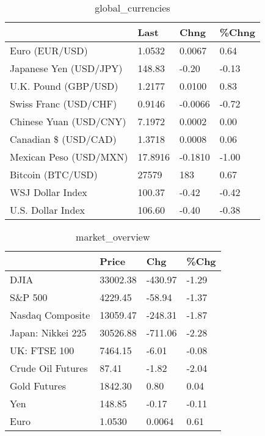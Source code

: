 \documentclass{article}%
\begin{document}
%


\begin{table}[htbp]%
\caption{global\_currencies}%
\centering%
\begin{adjustbox}{width=1\textwidth}%
\begin{tabular}{llll}
\toprule
                       &    Last &    Chng & \%Chng \\
\midrule
        Euro (EUR/USD) &  1.0532 &  0.0067 &  0.64 \\
Japanese Yen (USD/JPY) &  148.83 &   -0.20 & -0.13 \\
  U.K. Pound (GBP/USD) &  1.2177 &  0.0100 &  0.83 \\
 Swiss Franc (USD/CHF) &  0.9146 & -0.0066 & -0.72 \\
Chinese Yuan (USD/CNY) &  7.1972 &  0.0002 &  0.00 \\
  Canadian \$ (USD/CAD) &  1.3718 &  0.0008 &  0.06 \\
Mexican Peso (USD/MXN) & 17.8916 & -0.1810 & -1.00 \\
     Bitcoin (BTC/USD) &   27579 &     183 &  0.67 \\
      WSJ Dollar Index &  100.37 &   -0.42 & -0.42 \\
     U.S. Dollar Index &  106.60 &   -0.40 & -0.38 \\
\bottomrule
\end{tabular}
%
\end{adjustbox}%
\end{table}

%


\begin{table}[htbp]%
\caption{market\_overview}%
\centering%
\begin{adjustbox}{width=1\textwidth}%
\begin{tabular}{llll}
\toprule
                  &    Price &     Chg &  \%Chg \\
\midrule
             DJIA & 33002.38 & -430.97 & -1.29 \\
          S\&P 500 &  4229.45 &  -58.94 & -1.37 \\
 Nasdaq Composite & 13059.47 & -248.31 & -1.87 \\
Japan: Nikkei 225 & 30526.88 & -711.06 & -2.28 \\
     UK: FTSE 100 &  7464.15 &   -6.01 & -0.08 \\
Crude Oil Futures &    87.41 &   -1.82 & -2.04 \\
     Gold Futures &  1842.30 &    0.80 &  0.04 \\
              Yen &   148.85 &   -0.17 & -0.11 \\
             Euro &   1.0530 &  0.0064 &  0.61 \\
\bottomrule
\end{tabular}
%
\end{adjustbox}%
\end{table}

%
\end{document}
